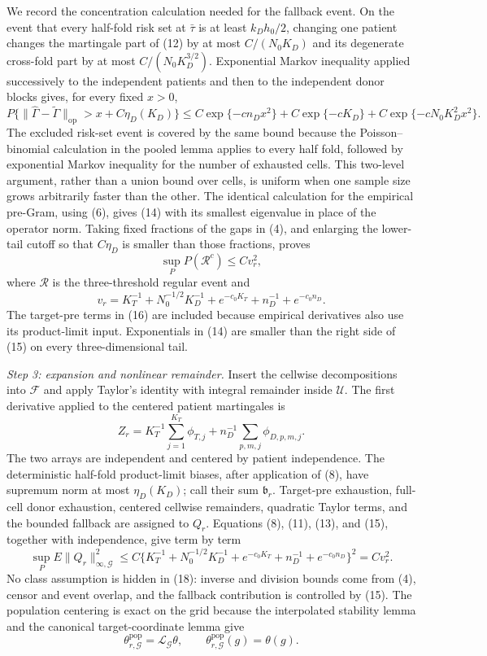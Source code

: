 We record the concentration calculation needed for the fallback event.
On the event that every half-fold risk set at \(\bar\tau\) is at least
\(k_Dh_0/2\), changing one patient changes the martingale part of (12) by
at most \(C/(N_0K_D)\) and its degenerate cross-fold part by at most
\(C/(N_0K_D^{3/2})\).  Exponential Markov inequality applied successively
to the independent patients and then to the independent donor blocks gives,
for every fixed \(x>0\),
\[
 P\{\|\widehat\Gamma-\widetilde\Gamma\|_{\mathrm{op}}>x
       +C\eta_D(K_D)\}
 \le C\exp\{-c n_Dx^2\}+C\exp\{-cK_D\}+C\exp\{-cN_0K_D^2x^2\}.
                                                                    \tag{14}
\]
The excluded risk-set event is covered by the same bound because the
Poisson--binomial calculation in the pooled lemma applies to every half
fold, followed by exponential Markov inequality for the number of
exhausted cells.  This two-level argument, rather than a union bound over
cells, is uniform when one sample size grows arbitrarily faster than the
other.  The identical calculation for the empirical pre-Gram, using (6),
gives (14) with its smallest eigenvalue in place of the operator norm.
Taking fixed fractions of the gaps in (4), and enlarging the lower-tail
cutoff so that \(C\eta_D\) is smaller than those fractions, proves
\[
 \sup_PP(\mathcal R^c)\le Cv_r^2,                           \tag{15}
\]
where \(\mathcal R\) is the three-threshold regular event and
\[
 v_r=K_T^{-1}+N_0^{-1/2}K_D^{-1}+e^{-c_0K_T}
       +n_D^{-1}+e^{-c_0n_D}.                               \tag{16}
\]
The target-pre terms in (16) are included because empirical derivatives
also use its product-limit input.  Exponentials in (14) are smaller than
the right side of (15) on every three-dimensional tail.

\emph{Step 3: expansion and nonlinear remainder.}
Insert the cellwise decompositions into \(\mathcal F\) and apply Taylor's
identity with integral remainder inside \(\mathcal U\).  The first
derivative applied to the centered patient martingales is
\[
 Z_r=K_T^{-1}\sum_{j=1}^{K_T}\phi_{T,j}
     +n_D^{-1}\sum_{p,m,j}\phi_{D,p,m,j}.                  \tag{17}
\]
The two arrays are independent and centered by patient independence.  The
deterministic half-fold product-limit biases, after application of (8),
have supremum norm at most \(\eta_D(K_D)\); call their sum
\(\mathfrak b_r\).  Target-pre exhaustion, full-cell donor exhaustion,
centered cellwise remainders, quadratic Taylor terms, and the bounded
fallback are assigned to \(Q_r\).  Equations (8), (11), (13), and (15),
together with independence, give term by term
\[
 \sup_PE\|Q_r\|_{\infty,\mathcal G}^2
 \le C\{K_T^{-1}+N_0^{-1/2}K_D^{-1}+e^{-c_0K_T}
          +n_D^{-1}+e^{-c_0n_D}\}^2
 =Cv_r^2.                                                    \tag{18}
\]
No class assumption is hidden in (18): inverse and division bounds come
from (4), censor and event overlap, and the fallback contribution is
controlled by (15).  The population centering is exact on the grid because
the interpolated stability lemma and the canonical target-coordinate lemma
give
\[
 \theta^{\mathrm{pop}}_{r,\mathcal G}
 =\mathcal L_{\mathcal G}\theta,
 \qquad
 \theta^{\mathrm{pop}}_{r,\mathcal G}(g)=\theta(g).         \tag{19}
\]


